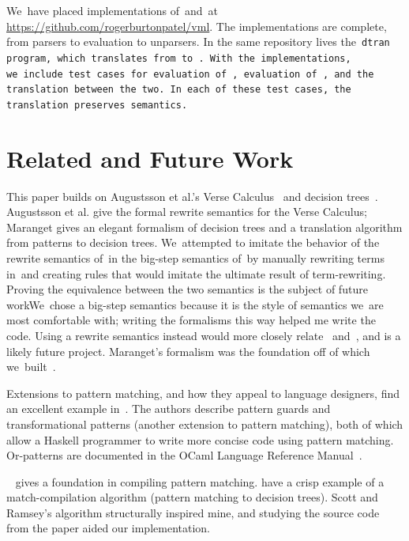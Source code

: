 \documentclass[article,screen,12pt, nonacm]{acmart}
\begin{document}
    We~have placed implementations of~\VMinus and~\D at
    \url{https://github.com/rogerburtonpatel/vml}. The implementations are
    complete, from parsers to evaluation to unparsers. In the same repository
    lives the~\tt{dtran} program, which translates from~\VMinus to~\D. With the
    implementations, we~include test cases for
    evaluation of~\VMinus, evaluation
    of~\D, and the translation between the two. 
    In~each of these test cases, the translation preserves semantics. 


    \section{Related and Future Work}

    This paper builds on Augustsson et al.'s Verse Calculus~\citep{verse} and
    decision trees~\citep{maranget}. Augustsson et al. give the formal rewrite
    semantics for the Verse Calculus; Maranget gives an elegant formalism of
    decision trees and a translation algorithm from patterns to decision trees.
    We~attempted to imitate the behavior of the rewrite semantics of~\VC in the
    big-step semantics of~\VMinus by manually rewriting terms in~\VC and
    creating rules that would imitate the ultimate result of term-rewriting.
    Proving the equivalence between the two semantics is the subject of future
    workWe~chose a big-step semantics because it is the style of semantics we~are
    most comfortable with; writing the formalisms this way helped me write the
    code. Using a rewrite semantics instead would more closely relate~\VMinus
    and~\VC, and is a likely future project. Maranget's formalism was the
    foundation off of which we~built~\D. 
    
    Extensions to pattern matching, and how they appeal to language designers,
    find an excellent example in~\citet{guardproposal}. The authors describe
    pattern guards and transformational patterns (another extension to pattern
    matching), both of which allow a Haskell programmer to write more concise
    code using pattern matching. Or-patterns are documented in the OCaml
    Language Reference Manual~\citep{ocaml}.
    
    \citet{augustsson1985compiling}~ gives a foundation in compiling pattern
    matching. \citet{scottramsey} have a crisp example of a match-compilation
    algorithm (pattern matching to decision trees). Scott and Ramsey's algorithm
    structurally inspired mine, and studying the source code from the paper
    aided our implementation. 
\end{document}
